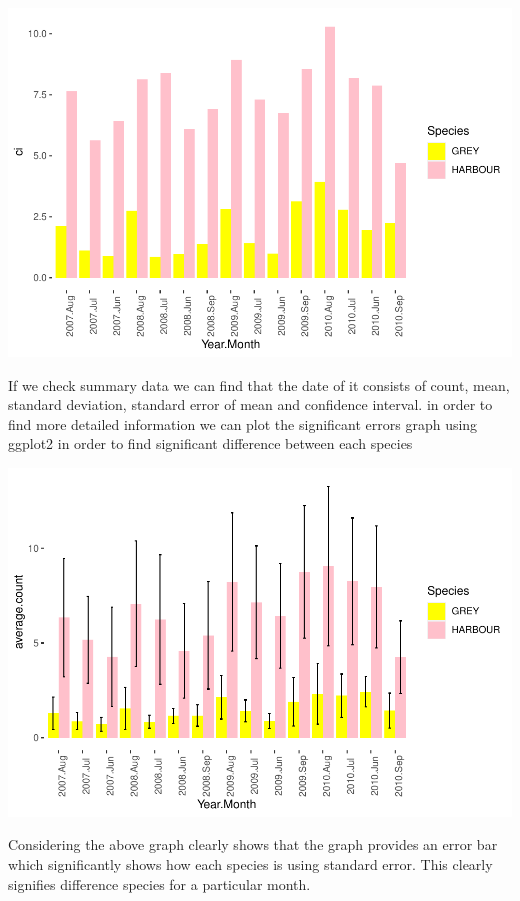 \documentclass[
]{article}
\begin{document}
\includegraphics{Statistical-analysis-in-RStudio_files/figure-latex/unnamed-chunk-37-1.pdf}

If we check summary data we can find that the date of it consists of
count, mean, standard deviation, standard error of mean and confidence
interval. in order to find more detailed information we can plot the
significant errors graph using ggplot2 in order to find significant
difference between each species

\includegraphics{Statistical-analysis-in-RStudio_files/figure-latex/unnamed-chunk-38-1.pdf}

Considering the above graph clearly shows that the graph provides an
error bar which significantly shows how each species is using standard
error. This clearly signifies difference species for a particular month.
\end{document}

